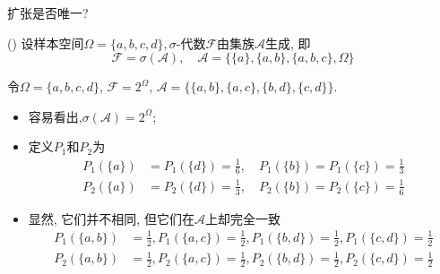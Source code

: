 \begin{frame}{扩张是否唯一?}
\begin{exam}
() 设样本空间${\Omega=\{a, b, c, d\}, \sigma}$-代数${\mathcal{F}}$由集族${\mathcal{A}}$生成, 即
	\[
	\mathcal{F}=\sigma(\mathcal{A}), \quad  \mathcal{A}=\{\{a\},\{a, b\},\{a, b, c\}, \Omega\}
	\]
\end{exam}
\pause

\begin{exam}
令$\Omega=\{a, b, c, d\}$, $\mathcal{F}=2^{\Omega}$, $\mathcal{A}=\{\{a, b\},\{a, c\},\{b, d\},\{c, d\}\}$.

\begin{itemize}[<+-|alert@+>]
	\item 容易看出,${\sigma(\mathcal{A})=2^{\Omega}}$;
	\item 定义${P_{1}}$和${P_{2}}$为
	{\small \begin{align*}
		P_{1}(\{a\})&=P_{1}(\{d\})=\frac{1}{6}, \quad  P_{1}(\{b\})=P_{1}(\{c\})=\frac{1}{3} \\
		P_{2}(\{a\})&=P_{2}(\{d\})=\frac{1}{3}, \quad  P_{2}(\{b\})=P_{2}(\{c\})=\frac{1}{6}
	\end{align*}}

	\item 显然, 它们并不相同, 但它们在${\mathcal{A}}$上却完全一致
	{\small \begin{align*}
		P_{1}(\{a, b\})&=\frac{1}{2}, P_{1}(\{a, c\})=\frac{1}{2}, P_{1}(\{b, d\})=\frac{1}{2}, P_{1}(\{c, d\})=\frac{1}{2}\\
		P_{2}(\{a, b\})&=\frac{1}{2}, P_{2}(\{a, c\})=\frac{1}{2}, P_{2}(\{b, d\})=\frac{1}{2}, P_{2}(\{c, d\})=\frac{1}{2}
	\end{align*}}
\end{itemize}


\end{exam}



\end{frame}


